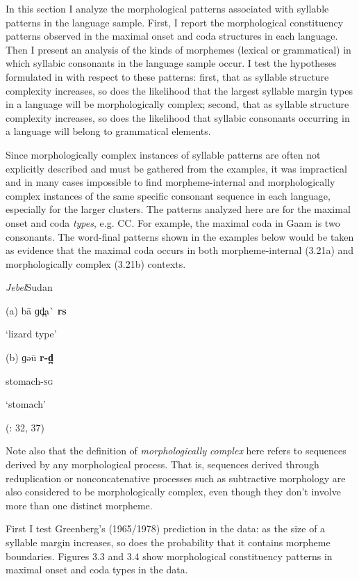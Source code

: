   In this section I analyze the morphological patterns associated with syllable patterns in the language sample. First, I report the morphological constituency patterns observed in the maximal onset and coda structures in each language. Then I present an analysis of the kinds of morphemes (lexical or grammatical) in which syllabic consonants in the language sample occur. I test the hypotheses formulated in  with respect to these patterns: first, that as syllable structure complexity increases, so does the likelihood that the largest syllable margin types in a language will be morphologically complex; second, that as syllable structure complexity increases, so does the likelihood that syllabic consonants occurring in a language will belong to grammatical elements.

  Since morphologically complex instances of syllable patterns are often not explicitly described and must be gathered from the examples, it was impractical and in many cases impossible to find morpheme-internal and morphologically complex instances of the same specific consonant sequence in each language, especially for the larger clusters. The patterns analyzed here are for the maximal onset and coda \textit{types}, e.g. CC. For example, the maximal coda in Gaam is two consonants. The word-final patterns shown in the examples below would be taken as evidence that the maximal coda occurs in both morpheme-internal (3.21a) and morphologically complex (3.21b) contexts.

\ea\label{ex:(3.21)}
 \textit{Jebel}{Sudan}

(a)  ba\={} ɡd̪a\`{} \textbf{rs}

\glt ‘lizard type’

(b)  ɡəu\={} \textbf{r-d̪}

stomach-\textsc{sg}

\glt ‘stomach’

(\citealt{Stirtz2011}: 32, 37)

\z

  Note also that the definition of \textit{morphologically} \textit{complex} here refers to sequences derived by any morphological process. That is, sequences derived through reduplication or nonconcatenative processes such as subtractive morphology are also considered to be morphologically complex, even though they don’t involve more than one distinct morpheme.

  First I test Greenberg’s (1965/1978) prediction in the data: as the size of a syllable margin increases, so does the probability that it contains morpheme boundaries. Figures 3.3 and 3.4 show morphological constituency patterns in maximal onset and coda types in the data.

